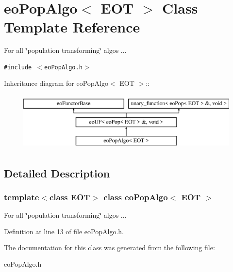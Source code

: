 \section{eo\-Pop\-Algo$<$ EOT $>$ Class Template Reference}
\label{classeo_pop_algo}
For all \char`\"{}population transforming\char`\"{} algos ...  


{\tt \#include $<$eo\-Pop\-Algo.h$>$}

Inheritance diagram for eo\-Pop\-Algo$<$ EOT $>$::\begin{figure}[H]
\begin{center}
\leavevmode
\includegraphics[height=3cm]{classeo_pop_algo}
\end{center}
\end{figure}


\subsection{Detailed Description}
\subsubsection*{template$<$class EOT$>$ class eo\-Pop\-Algo$<$ EOT $>$}

For all \char`\"{}population transforming\char`\"{} algos ... 



Definition at line 13 of file eo\-Pop\-Algo.h.

The documentation for this class was generated from the following file:\begin{CompactItemize}
\item 
eo\-Pop\-Algo.h\end{CompactItemize}
